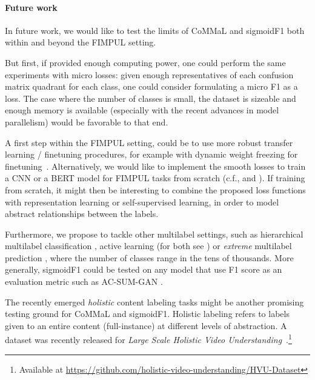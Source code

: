 



\paragraph{Future work}
In future work, we would like to test the limits of CoMMaL and sigmoidF1 both within and beyond the FIMPUL setting.

But first, if provided enough computing power, one could perform the same experiments with micro losses: given enough representatives of each confusion matrix quadrant for each class, one could consider formulating a micro F1 as a loss. The case where the number of classes is small, the dataset is sizeable and enough memory is available (especially with the recent advances in model parallelism) would be favorable to that end.


A first step within the FIMPUL setting, could be to use more robust transfer learning / finetuning procedures, for example with dynamic weight freezing for finetuning~\cite{ULMFit}. Alternatively, we would like to implement the smooth losses to train a CNN or a BERT model for FIMPUL tasks from scratch (c.f., \cite{tencent} and \cite{focalLoss}). If training from scratch, it might then be interesting to combine the proposed loss functions with representation learning \cite{unsupervisedImage,highResRepresentation} or self-supervised learning, in order to model abstract relationships between the labels.

Furthermore, we propose to tackle other multilabel settings, such as hierarchical multilabel classification \cite{HARAM},  active learning (for both see \cite{activeLearningMultiLabel}) or \emph{extreme} multilabel prediction \cite{extremeMultilabelText, extremeSIGIR}, where the number of classes range in the tens of thousands. More generally, sigmoidF1 could be tested on any model that use F1 score as an evaluation metric such as AC-SUM-GAN \cite{AC-SUM-GAN}.

The recently emerged \textit{holistic} content labeling tasks might be another promising testing ground for CoMMaL and sigmoidF1. Holistic labeling refers to labels given to an entire content (full-instance) at different levels of abstraction. A dataset was recently released for \emph{Large Scale Holistic Video Understanding}~\cite{holisticVideoData}.\footnote{Available at \url{https://github.com/holistic-video-understanding/HVU-Dataset}}

